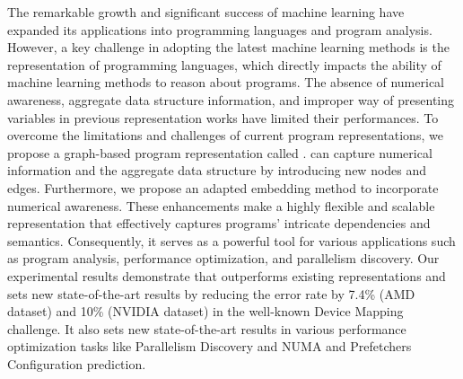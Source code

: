 The remarkable growth and significant success of machine learning have expanded its applications into programming languages and program analysis.
However, a key challenge in adopting the latest machine learning methods is the representation of programming languages, which directly impacts the ability of machine learning methods to reason about programs.
The absence of numerical awareness, aggregate data structure information, and improper way of presenting variables in previous representation works have limited their performances. 
To overcome the limitations and challenges of current program representations, we propose a graph-based program representation called \ourtool.
\ourtool can capture numerical information and the aggregate data structure by introducing new nodes and edges.
Furthermore, we propose an adapted embedding method to incorporate numerical awareness.
These enhancements make \ourtool a highly flexible and scalable representation that effectively captures programs' intricate dependencies and semantics. 
Consequently, it serves as a powerful tool for various applications such as program analysis, performance optimization, and parallelism discovery. Our experimental results demonstrate that \ourtool outperforms existing representations and sets new state-of-the-art results by reducing the error rate by 7.4\% (AMD dataset) and 10\% (NVIDIA dataset) in the well-known Device Mapping challenge. It also sets new state-of-the-art results in various performance optimization tasks like Parallelism Discovery and NUMA and Prefetchers Configuration prediction.